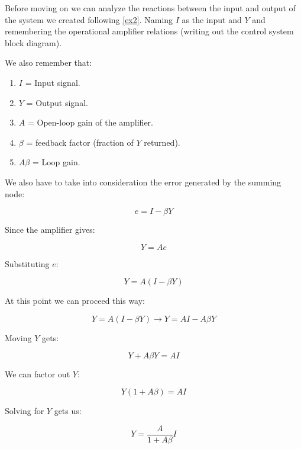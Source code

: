 \documentclass[../main.tex]{subfiles}
\begin{document}
Before moving on we can analyze the reactions between the input and output of the system we created following \autoref{ex2}. Naming $I$ as the input and $Y$ and remembering the operational amplifier relations (writing out the control system block diagram).

We also remember that:

\begin{enumerate}[label=\textbf{-}]
	\item $I$ = Input signal.
	\item $Y$ = Output signal.
	\item $A$ = Open-loop gain of the amplifier.
	\item $\beta$ = feedback factor (fraction of $Y$ returned).
	\item $A\beta$ = Loop gain.
\end{enumerate}

We also have to take into consideration the error generated by the summing node:

\begin{equation}
	e = I - \beta Y
\end{equation}

Since the amplifier gives:

\begin{equation}
	Y = Ae
\end{equation}

Substituting $e$:

\begin{equation}
	Y = A(I - \beta Y)
\end{equation}

At this point we can proceed this way:

\begin{equation}
	Y = A(I - \beta Y) \rightarrow Y = AI - A\beta Y
\end{equation}

Moving $Y$ gets:

\begin{equation}
	Y + A\beta Y = AI
\end{equation}

We can factor out $Y$:

\begin{equation}
	Y(1 + A\beta) = AI
\end{equation}

Solving for $Y$ gets us:

\begin{equation}
	Y = \frac{A}{1 + A\beta} I
\end{equation}
\end{document}
